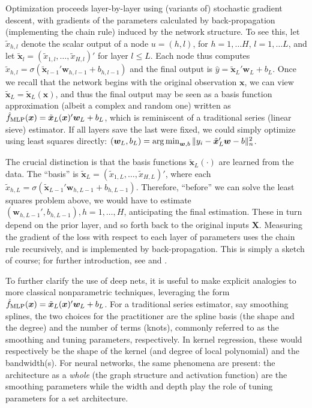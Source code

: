 \documentclass[11pt]{article}
\numberwithin{equation}{section}
\theoremstyle{definition}
\DeclareMathOperator*{\argmin}{arg\,min}
\def\argmin{\operatornamewithlimits{arg\,min}}
\newcommand{\bw}{\bm{w}}
\newcommand{\bx}{\bm{x}}
\newcommand{\bX}{\bm{X}}
\begin{document}
 


Optimization proceeds layer-by-layer using (variants of) stochastic gradient descent, with gradients of the parameters calculated by back-propagation (implementing the chain rule) induced by the network structure. To see this, let $\tilde{x}_{h,l}$ denote the scalar output of a node $u = (h,l)$, for $h = 1, \ldots H$, $l = 1, \ldots L$, and let $\tilde{\bx}_{l} = (\tilde{x}_{1,l}, \ldots, \tilde{x}_{H,l})'$ for layer $l \leq L$. Each node thus computes $\tilde{x}_{h,l} = \sigma(\tilde{\bx}_{l-1}'\bw_{h,l-1} + b_{h,l-1})$ and the final output is $\hat{y} = \tilde{\bx}_{L}'\bw_{L} + b_{L}$. Once we recall that the network begins with the original observation $\bx$, we can view $\tilde{\bx}_{L} = \tilde{\bx}_{L}(\bx)$, and thus the final output may be seen as a basis function approximation (albeit a complex and random one) written as $\hat{f}_{\rm MLP}(\bx) = \tilde{\bx}_{L}(\bx)'\bw_{L} + b_{L}$, which is reminiscent of a traditional series (linear sieve) estimator. If all layers save the last were fixed, we could simply optimize using least squares directly: $(\bw_{L}, b_{L}) = \argmin_{\bw, b} \| y_i - \tilde{\bx}_{L}'\bw - b\|_n^2$. 



The crucial distinction is that the basis functions $\tilde{\bx}_{L}(\cdot)$ are learned from the data. The ``basis'' is $\tilde{\bx}_{L}  = (\tilde{x}_{1,L}, \ldots, \tilde{x}_{H,L})'$, where each $\tilde{x}_{h,L} = \sigma(\tilde{\bx}_{L-1}'\bw_{h,L-1} + b_{h,L-1})$. Therefore, ``before'' we can solve the least squares problem above, we would have to estimate $(\bw_{h,L-1}', b_{h,L-1}), h = 1, \ldots, H$, anticipating the final estimation. These in turn depend on the prior layer, and so forth back to the original inputs $\bX$. Measuring the gradient of the loss with respect to each layer of parameters uses the chain rule recursively, and is implemented by back-propagation. This is simply a sketch of course; for further introduction, see \citet{Hastie-Tibshirani-Friedman2009_book} and \cite{Goodfellow-Bengio-Courville2016_book}.


To further clarify the use of deep nets, it is useful to make explicit analogies to more classical nonparametric techniques, leveraging the form $\hat{f}_{\rm MLP}(\bx) = \tilde{\bx}_{L}(\bx)'\bw_{L} + b_{L}$. For a traditional series estimator, say smoothing splines, the two choices for the practitioner are the spline basis (the shape and the degree) and the number of terms (knots), commonly referred to as the smoothing and tuning parameters, respectively. In kernel regression, these would respectively be the shape of the kernel (and degree of local polynomial) and the bandwidth(s). For neural networks, the same phenomena are present: the architecture as a \emph{whole} (the graph structure and activation function) are the smoothing parameters while the width and depth play the role of tuning parameters for a set architecture.
\end{document}
